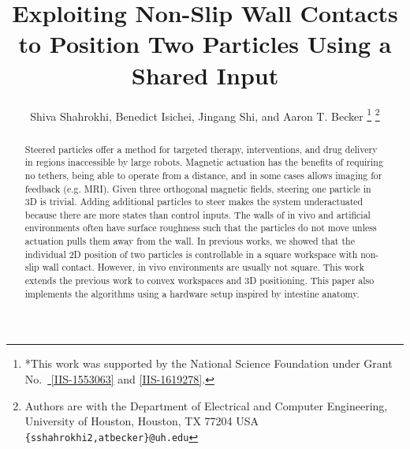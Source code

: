 \documentclass[letterpaper, 10 pt, conference]{ieeeconf}
\title{\LARGE \bf Exploiting Non-Slip Wall Contacts \\  to Position Two Particles Using a Shared Input}
\author{Shiva Shahrokhi, Benedict Isichei, Jingang Shi,  and Aaron T. Becker%
\thanks{*This work was supported by the National Science Foundation under Grant No.\ \href{http://nsf.gov/awardsearch/showAward?AWD_ID=1553063}{ [IIS-1553063]} and \href{http://nsf.gov/awardsearch/showAward?AWD_ID=1619278}{[IIS-1619278]}.}%
\thanks{Authors are with the Department of Electrical and Computer Engineering,  University of Houston, Houston, TX 77204 USA        {\tt\small  \{sshahrokhi2,atbecker\}@uh.edu}}%
}
\begin{document}
\maketitle
\thispagestyle{empty}
\pagestyle{empty}


\begin{abstract}


Steered particles offer a method for targeted therapy, interventions, and drug delivery in regions inaccessible by large robots.
Magnetic actuation has the benefits of requiring no tethers, being able to operate from a distance, and in some cases allows imaging for feedback (e.g. MRI).
Given three orthogonal magnetic fields, steering one particle in 3D is trivial. 
Adding additional particles to steer makes the system underactuated because there are more states than control inputs. 
The walls of in vivo and artificial environments often have surface roughness such that the particles do not move unless actuation pulls them away from the wall.
In previous works, we showed that the individual 2D position of two particles is controllable in a square workspace with non-slip wall contact. 
However, in vivo environments are usually not square. 
This work extends the previous work to convex workspaces and 3D positioning. 
This paper also implements the algorithms using a hardware setup inspired by intestine anatomy.





\end{abstract}
\end{document}
